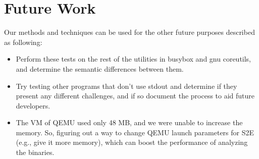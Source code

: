 \documentclass[conference]{IEEEtran}
\begin{document}

\section{Future Work}

Our methods and techniques can be used for the other future purposes described as following: 

\begin{itemize}
  \item Perform these tests on the rest of the utilities in busybox and gnu coreutils, and determine the semantic differences between them.
  \item Try testing other programs that don't use stdout and determine if they present any different challenges, and if so document the process to aid future developers.
  \item The VM of QEMU used only 48 MB, and we were unable to increase the memory. So, figuring out a way to change QEMU launch parameters for S2E (e.g., give it more memory), which can boost the performance of analyzing the binaries. 
\end{itemize}

\end{document}

